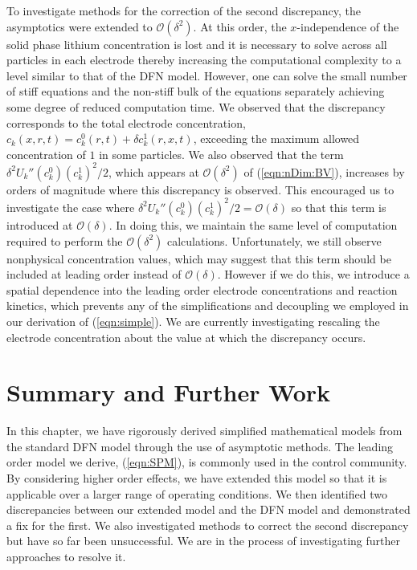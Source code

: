 \documentclass[preprint]{elsarticle}
\begin{document}
To investigate methods for the correction of the second discrepancy, the asymptotics were extended to $\mathcal{O}(\delta^2)$. At this order, the $x$-independence of the solid phase lithium concentration is lost and it is necessary to solve across all particles in each electrode thereby increasing the computational complexity to a level similar to that of the DFN model. However, one can solve the small number of stiff equations and the non-stiff bulk of the equations separately achieving some degree of reduced computation time. We observed that the discrepancy corresponds to the total electrode concentration, $c_k(x,r,t) = c_k^0(r,t) + \delta c_k^1(r,x,t)$, exceeding the maximum allowed concentration of $1$ in some particles. We also observed that the term $\delta^2 U_k''(c_k^0) (c_k^1)^2 / 2$, which appears at $\mathcal{O}(\delta^2)$ of (\ref{eqn:nDim:BV}), increases by orders of magnitude where this discrepancy is observed. This encouraged us to investigate the case where $\delta^2 U_k''(c_k^0) (c_k^1)^2 / 2=\mathcal{O}(\delta)$ so that this term is introduced at $\mathcal{O}(\delta)$. In doing this, we maintain the same level of computation required to perform the $\mathcal{O}(\delta^2)$ calculations. Unfortunately, we still observe nonphysical concentration values, which may suggest that this term should be included at leading order instead of $\mathcal{O}(\delta)$. However if we do this, we introduce a spatial dependence into the leading order electrode concentrations and reaction kinetics, which prevents any of the simplifications and decoupling we employed in our derivation of (\ref{eqn:simple}). We are currently investigating rescaling the electrode concentration about the value at which the discrepancy occurs. 


\section{Summary and Further Work} 
In this chapter, we have rigorously derived simplified mathematical models from the standard DFN model through the use of asymptotic methods. The leading order model we derive, (\ref{eqn:SPM}), is commonly used in the control community. By considering higher order effects, we have extended this model so that it is applicable over a larger range of operating conditions. We then identified two discrepancies between our extended model and the DFN model and demonstrated a fix for the first. We also investigated methods to correct the second discrepancy but have so far been unsuccessful. We are in the process of investigating further approaches to resolve it. \\ 
\end{document}
